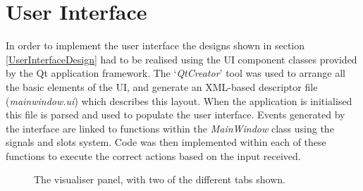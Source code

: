 
\section{User Interface} \label{UserInterfaceImplementation}
In order to implement the user interface the designs shown in section \ref{UserInterfaceDesign} had to be realised using the UI component classes provided by the Qt application framework. The `\textit{QtCreator}' tool was used to arrange all the basic elements of the UI, and generate an XML-based descriptor file (\textit{mainwindow.ui}) which describes this layout. When the application is initialised this file is parsed and used to populate the user interface. Events generated by the interface are linked to functions within the \textit{MainWindow} class using the signals and slots system. Code was then implemented within each of these functions to execute the correct actions based on the input received.

\begin{figure}
 \centering
 \decoRule
 \caption[Visualiser Panel]{The visualiser panel, with two of the different tabs shown.}
 \label{fig:VisualiserPanel}
\end{figure}

